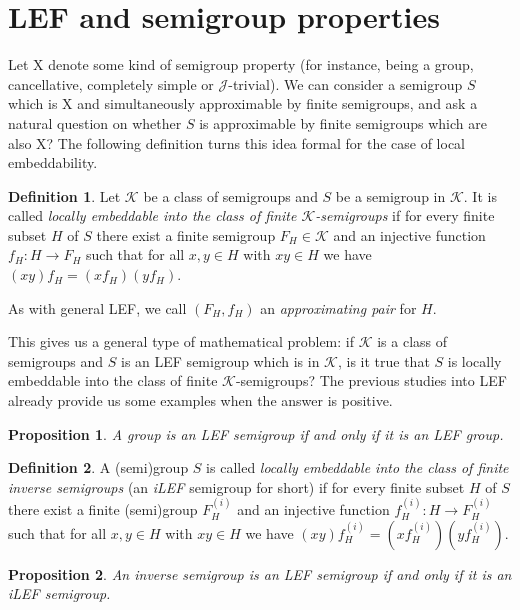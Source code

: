 \documentclass{article}
\newtheorem{proposition}{Proposition}
\theoremstyle{definition}
\newtheorem{definition}{Definition}
\def\J{\mathcal J}
\begin{document}
\section{LEF and semigroup properties}

Let X denote some kind of semigroup property (for instance, being a group, cancellative, completely simple or $\J$-trivial). We can consider a semigroup $S$ which is X and simultaneously approximable by finite semigroups, and ask a natural question on whether $S$ is approximable by finite semigroups which are also X? The following definition turns this idea formal for the case of local embeddability.

\begin{definition}
Let $\mathcal{K}$ be a class of semigroups and $S$ be a semigroup in $\mathcal{K}$. It is called {\em locally embeddable into the class of finite $\mathcal{K}$-semigroups} if for every finite subset $H$ of $S$ there exist a finite semigroup $F_H \in \mathcal{K}$ and an injective function $f_H: H \rightarrow F_H$ such that for all  $x,y \in H$ with $xy \in H$ we have $(xy)f_H = (xf_H)(yf_H)$.

As with general LEF, we call $(F_H, f_H)$ an {\em approximating pair} for $H$.
\end{definition}

This gives us a general type of mathematical problem: if $\mathcal{K}$ is a class of semigroups and $S$ is an LEF semigroup which is in $\mathcal{K}$, is it true that $S$ is  locally embeddable into the class of finite $\mathcal{K}$-semigroups? The previous studies into LEF already provide us some examples when the answer is positive.

\begin{proposition}\label{prop_lefgr}\emph{\cite[Proposition 2.2]{K23}}
A group is an LEF semigroup if and only if it is an LEF group.
\end{proposition}

\begin{definition}\label{def_ilef}{\cite[Definition 7]{K24}}
A (semi)group $S$ is called {\em locally embeddable into the class of finite inverse semigroups} (an {\em iLEF} semigroup  for short) if for every finite subset $H$ of $S$ there exist a finite (semi)group $F^{(i)}_H$ and an injective function $f^{(i)}_H: H \rightarrow F^{(i)}_H$ such that for all  $x,y \in H$ with $xy \in H$ we have $(xy)f^{(i)}_H = (xf^{(i)}_H)(yf^{(i)}_H)$.
\end{definition}

\begin{proposition}\label{prop_lefgr}\emph{\cite[Proposition 18]{K24}}
An inverse semigroup is an LEF semigroup if and only if it is an iLEF semigroup.
\end{proposition}
\end{document}
